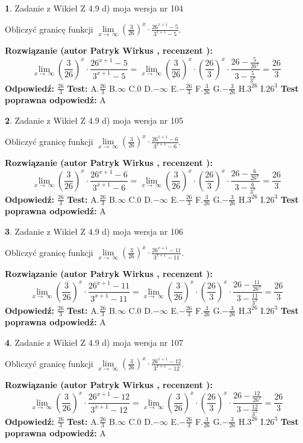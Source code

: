 \documentclass[12pt, a4paper]{article}
\theoremstyle{definition} %
\newtheorem{zad}{}
\newcommand{\zadStart}[1]{\begin{zad}#1\newline}
\newcommand{\zadStop}{\end{zad}}
\newcommand{\rozwStart}[2]{\noindent \textbf{Rozwiązanie (autor #1 , recenzent #2): }\newline}
\newcommand{\rozwStop}{\newline}
\newcommand{\odpStart}{\noindent \textbf{Odpowiedź:}\newline}
\newcommand{\odpStop}{\newline}
\newcommand{\testStart}{\noindent \textbf{Test:}\newline}
\newcommand{\testStop}{\newline}
\newcommand{\kluczStart}{\noindent \textbf{Test poprawna odpowiedź:}\newline}
\newcommand{\kluczStop}{\newline}
\begin{document}
\zadStart{Zadanie z Wikieł Z 4.9 d) moja wersja nr 104}


Obliczyć granicę funkcji  $\lim\limits_{x\to\ \infty}(\frac{3}{26})^{x}\cdot\frac{26^{x+1}-5}{3^{x+1}-5}$.
\zadStop
\rozwStart{Patryk Wirkus}{}
$$\lim\limits_{x\to\ \infty}(\frac{3}{26})^{x}\cdot\frac{26^{x+1}-5}{3^{x+1}-5}=\lim\limits_{x\to\ \infty}(\frac{3}{26})^{x}\cdot(\frac{26}{3})^{x} \cdot \frac{26-\frac{5}{26^{x}}}{3-\frac{5}{3^{x}}} = \frac{26}{3}$$
\rozwStop
\odpStart
$\frac{26}{3}$
\odpStop
\testStart
A.$\frac{26}{3}$ B.$\infty$ C.$0$ D.$-\infty$ E.$-\frac{26}{3}$
F.$\frac{3}{26}$ G.$-\frac{3}{26}$
H.$3^{26}$
I.$26^{3}$
\testStop
\kluczStart
A
\kluczStop



\zadStart{Zadanie z Wikieł Z 4.9 d) moja wersja nr 105}


Obliczyć granicę funkcji  $\lim\limits_{x\to\ \infty}(\frac{3}{26})^{x}\cdot\frac{26^{x+1}-6}{3^{x+1}-6}$.
\zadStop
\rozwStart{Patryk Wirkus}{}
$$\lim\limits_{x\to\ \infty}(\frac{3}{26})^{x}\cdot\frac{26^{x+1}-6}{3^{x+1}-6}=\lim\limits_{x\to\ \infty}(\frac{3}{26})^{x}\cdot(\frac{26}{3})^{x} \cdot \frac{26-\frac{6}{26^{x}}}{3-\frac{6}{3^{x}}} = \frac{26}{3}$$
\rozwStop
\odpStart
$\frac{26}{3}$
\odpStop
\testStart
A.$\frac{26}{3}$ B.$\infty$ C.$0$ D.$-\infty$ E.$-\frac{26}{3}$
F.$\frac{3}{26}$ G.$-\frac{3}{26}$
H.$3^{26}$
I.$26^{3}$
\testStop
\kluczStart
A
\kluczStop



\zadStart{Zadanie z Wikieł Z 4.9 d) moja wersja nr 106}


Obliczyć granicę funkcji  $\lim\limits_{x\to\ \infty}(\frac{3}{26})^{x}\cdot\frac{26^{x+1}-11}{3^{x+1}-11}$.
\zadStop
\rozwStart{Patryk Wirkus}{}
$$\lim\limits_{x\to\ \infty}(\frac{3}{26})^{x}\cdot\frac{26^{x+1}-11}{3^{x+1}-11}=\lim\limits_{x\to\ \infty}(\frac{3}{26})^{x}\cdot(\frac{26}{3})^{x} \cdot \frac{26-\frac{11}{26^{x}}}{3-\frac{11}{3^{x}}} = \frac{26}{3}$$
\rozwStop
\odpStart
$\frac{26}{3}$
\odpStop
\testStart
A.$\frac{26}{3}$ B.$\infty$ C.$0$ D.$-\infty$ E.$-\frac{26}{3}$
F.$\frac{3}{26}$ G.$-\frac{3}{26}$
H.$3^{26}$
I.$26^{3}$
\testStop
\kluczStart
A
\kluczStop



\zadStart{Zadanie z Wikieł Z 4.9 d) moja wersja nr 107}


Obliczyć granicę funkcji  $\lim\limits_{x\to\ \infty}(\frac{3}{26})^{x}\cdot\frac{26^{x+1}-12}{3^{x+1}-12}$.
\zadStop
\rozwStart{Patryk Wirkus}{}
$$\lim\limits_{x\to\ \infty}(\frac{3}{26})^{x}\cdot\frac{26^{x+1}-12}{3^{x+1}-12}=\lim\limits_{x\to\ \infty}(\frac{3}{26})^{x}\cdot(\frac{26}{3})^{x} \cdot \frac{26-\frac{12}{26^{x}}}{3-\frac{12}{3^{x}}} = \frac{26}{3}$$
\rozwStop
\odpStart
$\frac{26}{3}$
\odpStop
\testStart
A.$\frac{26}{3}$ B.$\infty$ C.$0$ D.$-\infty$ E.$-\frac{26}{3}$
F.$\frac{3}{26}$ G.$-\frac{3}{26}$
H.$3^{26}$
I.$26^{3}$
\testStop
\kluczStart
A
\kluczStop
\end{document}
